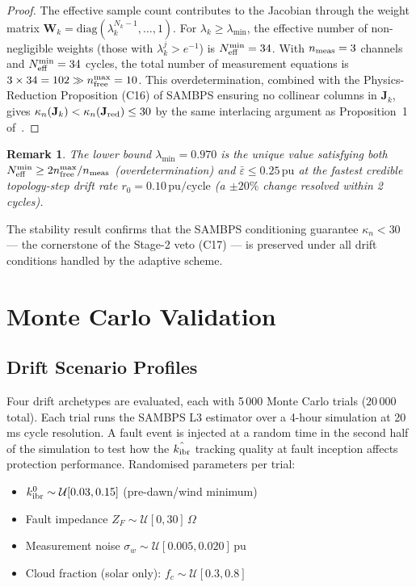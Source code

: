 \documentclass[journal]{IEEEtran}
\newtheorem{remark}{Remark}
\newcommand{\kibr}{k_{\rm ibr}}
\newcommand{\lambdamin}{\lambda_{\min}}
\newcommand{\Neff}{N_{\rm eff}}
\newcommand{\kappan}{\kappa_n}
\begin{document}
\begin{proof}
The effective sample count contributes to the Jacobian through the
weight matrix $\mathbf{W}_k = \mathrm{diag}(\lambda_k^{N_k-1},\ldots,1)$.
For $\lambda_k \geq \lambdamin$, the effective number of non-negligible
weights (those with $\lambda_k^j > e^{-1}$) is $\Neff^{\min} = 34$.
With $n_{\rm meas} = 3$ channels and $\Neff^{\min} = 34$ cycles, the
total number of measurement equations is $3 \times 34 = 102 \gg
n_{\rm free}^{\max} = 10$.  This overdetermination, combined with the
Physics-Reduction Proposition (C16) of SAMBPS ensuring no collinear
columns in $\mathbf{J}_k$, gives
$\kappan(\mathbf{J}_k) < \kappan(\mathbf{J}_{\rm red}) \leq 30$
by the same interlacing argument as Proposition~1 of~\cite{SAMBP_TR65}.
\end{proof}

\begin{remark}
The lower bound $\lambdamin = 0.970$ is the unique value satisfying
both $\Neff^{\min} \geq 2n_{\rm free}^{\max}/n_{\rm meas}$ (overdetermination)
and $\bar{\varepsilon} \leq 0.25\,\text{pu}$ at the fastest
credible topology-step drift rate $r_0 = 0.10\,\text{pu/cycle}$
(a $\pm 20\%$ change resolved within 2 cycles).
\end{remark}

The stability result confirms that the SAMBPS conditioning guarantee
$\kappan < 30$ — the cornerstone of the Stage-2 veto (C17) — is
preserved under all drift conditions handled by the adaptive scheme.

\section{Monte Carlo Validation}
\label{sec:validation}

\subsection{Drift Scenario Profiles}

Four drift archetypes are evaluated, each with 5\,000 Monte Carlo
trials ($20\,000$ total).  Each trial runs the SAMBPS L3 estimator
over a 4-hour simulation at 20\,ms cycle resolution.  A fault event
is injected at a random time in the second half of the simulation to
test how the $\hat{\kibr}$ tracking quality at fault inception affects
protection performance.  Randomised parameters per trial:
\begin{itemize}
  \item $\kibr^0 \sim \mathcal{U}[0.03, 0.15]$ (pre-dawn/wind minimum)
  \item Fault impedance $Z_F \sim \mathcal{U}[0, 30]\,\Omega$
  \item Measurement noise $\sigma_w \sim \mathcal{U}[0.005, 0.020]\,\text{pu}$
  \item Cloud fraction (solar only): $f_c \sim \mathcal{U}[0.3, 0.8]$
\end{itemize}
\end{document}
